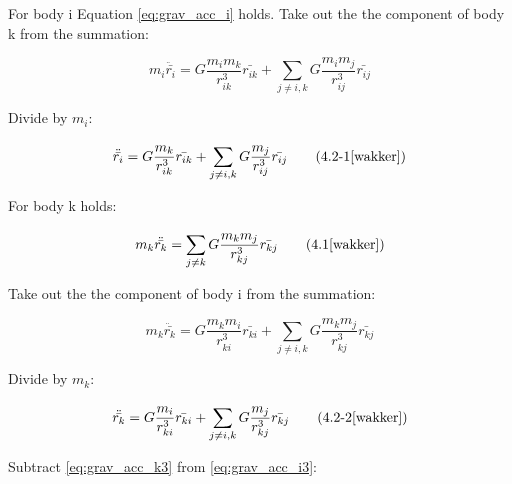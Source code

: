 \bigskip

\noindent For body i Equation \ref{eq:grav_acc_i} holds. Take out the the component of body k from the summation:

\begin{equation}
    m_{i} \ddot{\bar{r_{i}}} = G \frac{m_{i}m_{k}}{r_{ik}^3} \bar{r_{ik}} + \sum_{j \neq i,k}^{} G \frac{m_{i}m_{j}}{r_{ij}^3} \bar{r_{ij}}
    \label{eq:grav_acc_i2}
\end{equation}

\noindent Divide by $m_i$:

\begin{equation}
    \ddot{\bar{r_{i}}} = G \frac{m_{k}}{r_{ik}^3} \bar{r_{ik}} + \sum_{j \neq i,k}^{} G \frac{m_{j}}{r_{ij}^3} \bar{r_{ij}}
    \tag{4.2-1\cite{wakker}}
    \label{eq:grav_acc_i3}
\end{equation}

\noindent For body k holds:

\begin{equation}
    m_{k} \ddot{\bar{r_{k}}} = \sum_{j \neq k}^{} G \frac{m_{k}m_{j}}{r_{kj}^3} \bar{r_{kj}}
    \tag{4.1\cite{wakker}}
    \label{eq:grav_acc_k}
\end{equation}

\noindent Take out the the component of body i from the summation:

\begin{equation}
    m_{k} \ddot{\bar{r_{k}}} = G \frac{m_{k}m_{i}}{r_{ki}^3} \bar{r_{ki}} + \sum_{j \neq i,k}^{} G \frac{m_{k}m_{j}}{r_{kj}^3} \bar{r_{kj}}
    \label{eq:grav_acc_k2}
\end{equation}

\noindent Divide by $m_k$:

\begin{equation}
    \ddot{\bar{r_{k}}} = G \frac{m_{i}}{r_{ki}^3} \bar{r_{ki}} + \sum_{j \neq i,k}^{} G \frac{m_{j}}{r_{kj}^3} \bar{r_{kj}}
    \tag{4.2-2\cite{wakker}}
    \label{eq:grav_acc_k3}
\end{equation}

\noindent Subtract \ref{eq:grav_acc_k3} from \ref{eq:grav_acc_i3}:

